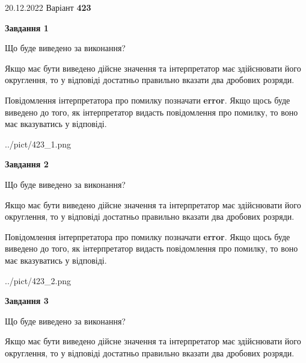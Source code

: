 \documentclass[12pt, ukrainian]{article}
\begin{document}
{20.12.2022 Варіант \No \textbf { 423 }\par}
{
\begin {Large}

{\begin {center}\textbf{Завдання 1}\end {center}}\par
Що буде виведено за виконання? \par

Якщо має бути виведено дійсне значення та інтерпретатор має здійснювати його округлення, 
то у відповіді достатньо правильно вказати два дробових розряди.

Повідомлення інтерпретатора про помилку позначати \textbf{error}.
Якщо щось буде виведено до того, як інтерпретатор видасть повідомлення про помилку, 
то воно має вказуватись у відповіді. \par

\begin{center}
	{../pict/423_1.png}
\end{center}
\newpage

{\begin {center}\textbf{Завдання 2}\end {center}}\par
Що буде виведено за виконання? \par

Якщо має бути виведено дійсне значення та інтерпретатор має здійснювати його округлення, 
то у відповіді достатньо правильно вказати два дробових розряди.

Повідомлення інтерпретатора про помилку позначати \textbf{error}.
Якщо щось буде виведено до того, як інтерпретатор видасть повідомлення про помилку, 
то воно має вказуватись у відповіді. \par

\begin{center}
	{../pict/423_2.png}
\end{center}
\newpage

{\begin {center}\textbf{Завдання 3}\end {center}}\par
Що буде виведено за виконання? \par

Якщо має бути виведено дійсне значення та інтерпретатор має здійснювати його округлення, 
то у відповіді достатньо правильно вказати два дробових розряди.


\end{Large}}
\end{document}
